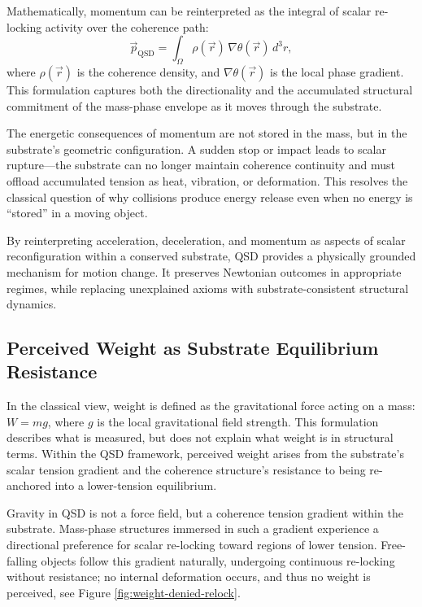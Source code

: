 \documentclass[entropy,article,submit,pdftex,moreauthors]{Definitions/mdpi}
\begin{document}
Mathematically, momentum can be reinterpreted as the integral of scalar re-locking activity over the coherence path:
\[
\vec{p}_{\text{QSD}} = \int_{\Omega} \rho(\vec{r}) \, \nabla \theta(\vec{r}) \, d^3r,
\]
where \( \rho(\vec{r}) \) is the coherence density, and \( \nabla \theta(\vec{r}) \) is the local phase gradient. This formulation captures both the directionality and the accumulated structural commitment of the mass-phase envelope as it moves through the substrate.

The energetic consequences of momentum are not stored in the mass, but in the substrate's geometric configuration. A sudden stop or impact leads to scalar rupture---the substrate can no longer maintain coherence continuity and must offload accumulated tension as heat, vibration, or deformation. This resolves the classical question of why collisions produce energy release even when no energy is “stored” in a moving object.

By reinterpreting acceleration, deceleration, and momentum as aspects of scalar reconfiguration within a conserved substrate, QSD provides a physically grounded mechanism for motion change. It preserves Newtonian outcomes in appropriate regimes, while replacing unexplained axioms with substrate-consistent structural dynamics.
\subsection{Perceived Weight as Substrate Equilibrium Resistance}

In the classical view, weight is defined as the gravitational force acting on a mass: \( W = mg \), where \( g \) is the local gravitational field strength. This formulation describes what is measured, but does not explain what weight is in structural terms. Within the QSD framework, perceived weight arises from the substrate’s scalar tension gradient and the coherence structure’s resistance to being re-anchored into a lower-tension equilibrium.

Gravity in QSD is not a force field, but a coherence tension gradient within the substrate. Mass-phase structures immersed in such a gradient experience a directional preference for scalar re-locking toward regions of lower tension. Free-falling objects follow this gradient naturally, undergoing continuous re-locking without resistance; no internal deformation occurs, and thus no weight is perceived, see Figure \ref{fig:weight-denied-relock}.
\end{document}
